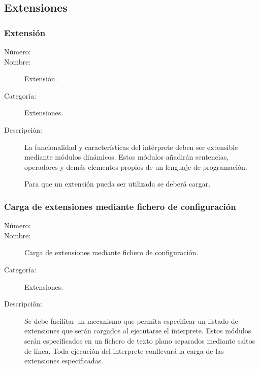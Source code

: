 \subsection{Extensiones}
\subsubsection{Extensión}
\begin{framed}
	\begin{description}
		\item [Número:] \cn
		\item [Nombre:] Extensión.
		\item [Categoría:] Extensiones.
		\item [Descripción:] La funcionalidad y características del intérprete deben ser extensible mediante módulos dinámicos. 
      Estos módulos añadirán sentencias, operadores y demás elementos propios de un lenguaje de programación. 
      
      Para que un extensión pueda ser utilizada se deberá cargar. 
	\end{description}
\end{framed}

\subsubsection{Carga de extensiones mediante fichero de configuración}
\begin{framed}
	\begin{description}
		\item [Número:] \cn
		\item [Nombre:] Carga de extensiones mediante fichero de configuración.
		\item [Categoría:] Extensiones.
		\item [Descripción:] Se debe facilitar un mecanismo que permita especificar un listado de extensiones que serán cargados al ejecutarse
      el interprete. Estos módulos serán especificados en un fichero de texto plano separados mediante saltos de línea. Toda ejecución del interprete
      conllevará la carga de las extensiones especificadas.
	\end{description}
\end{framed}

